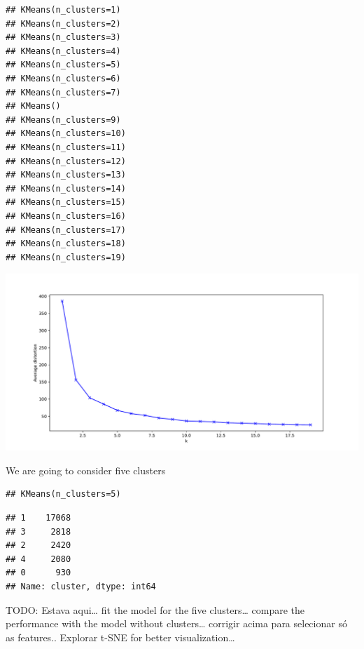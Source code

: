 \documentclass[
  12pt,
]{article}
\begin{document}
\begin{verbatim}
## KMeans(n_clusters=1)
## KMeans(n_clusters=2)
## KMeans(n_clusters=3)
## KMeans(n_clusters=4)
## KMeans(n_clusters=5)
## KMeans(n_clusters=6)
## KMeans(n_clusters=7)
## KMeans()
## KMeans(n_clusters=9)
## KMeans(n_clusters=10)
## KMeans(n_clusters=11)
## KMeans(n_clusters=12)
## KMeans(n_clusters=13)
## KMeans(n_clusters=14)
## KMeans(n_clusters=15)
## KMeans(n_clusters=16)
## KMeans(n_clusters=17)
## KMeans(n_clusters=18)
## KMeans(n_clusters=19)
\end{verbatim}

\includegraphics{articleCustomerDropoutMembership_files/figure-latex/elbowCalculation-1.pdf}

We are going to consider five clusters

\begin{verbatim}
## KMeans(n_clusters=5)
\end{verbatim}

\begin{verbatim}
## 1    17068
## 3     2818
## 2     2420
## 4     2080
## 0      930
## Name: cluster, dtype: int64
\end{verbatim}

TODO: Estava aqui\ldots{} fit the model for the five clusters\ldots{} compare the
performance with the model without clusters\ldots{} corrigir acima para selecionar só
as features.. Explorar t-SNE for better visualization\ldots{}
\end{document}
